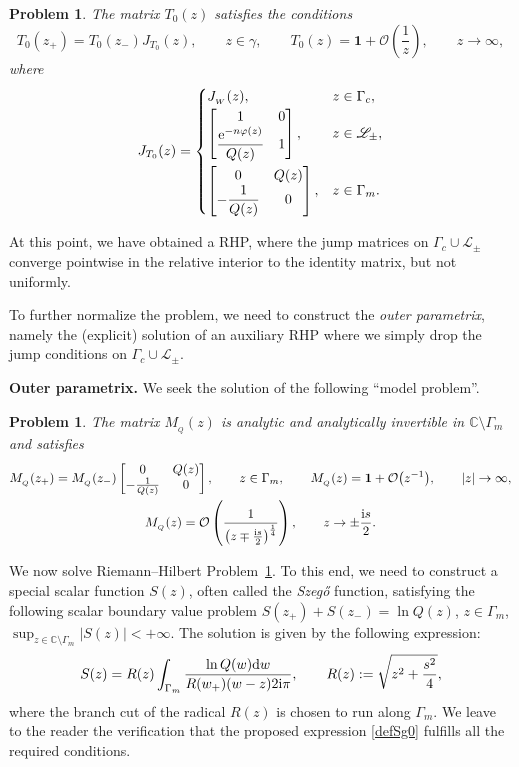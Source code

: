 \documentclass[10pt,a4paper]{amsart}
\numberwithin{equation}{section}
\newtheorem{problem}[Theorem]{Problem}
\theoremstyle{definition}
\def \scr{\mathscr}
\def\le{\left}
\def\ri{\right}
\def \d{{\mathrm d}}
\def\be{\begin{equation}}
\def\ee{\end{equation}}
\def \1{\mathbf 1}
\def\C{{\mathbb C}}
\begin{document}
\begin{problem}
\label{RHPT0}
The matrix $T_0(z)$ satisfies the conditions
\[
T_0(z_+)= T_0(z_-) J_{T_0}(z), \qquad z\in \gamma,\qquad
T_0(z) = \1 + \mathcal O\le(\frac 1 z \ri), \qquad z\to \infty,
\]
where
\[
J_{T_0}(z) =
\begin{cases}
J_{_W}(z), & z\in \Gamma_c,\\
 \begin{bmatrix}
1 & 0 \\
\displaystyle\frac{ {\rm e}^{-n\varphi(z)}}{Q(z)} & 1
\end{bmatrix},
& z\in \scr L_\pm,
\vspace{1mm}\\
\begin{bmatrix}
 0 & Q(z) \\
\displaystyle -\frac 1 {Q(z)} & 0
\end{bmatrix},
 & z\in \Gamma_m.
\end{cases}
\]
\end{problem}
At this point, we have obtained a RHP, where the jump matrices on $\Gamma_{c} \cup \scr L_\pm$ converge pointwise in the relative interior to the identity matrix, but not uniformly.

To further normalize the problem, we need to construct the {\it outer parametrix}, namely the (explicit) solution of an auxiliary RHP where we simply drop the jump conditions on $\Gamma_c\cup \scr L_\pm$.

{\bf Outer parametrix.}
We seek the solution of the following ``model problem''.
\begin{problem}
\label{RHPM0}
The matrix $M_{_Q}(z)$ is analytic and analytically invertible in $\C\setminus \Gamma_m$ and satisfies
\begin{gather*}
M_{_Q}(z_+) = M_{_Q}(z_-) \begin{bmatrix}
0 & Q(z)\\ -\frac 1 {Q(z)} & 0
\end{bmatrix},\qquad z\in \Gamma_m
,\qquad
M_{_Q}(z) = \1 + \mathcal O\bigl(z^{-1}\bigr),\qquad |z|\to \infty,\\
M_{_Q}(z) = \mathcal O\le(\frac 1{ \le(z\mp \frac {{\rm i}s}2\ri)^{\frac 1 4} }\ri),\qquad z\to \pm \frac {{\rm i}s}2.
\end{gather*}
\end{problem}
We now solve Riemann--Hilbert Problem~\ref{RHPM0}.
To this end, we need to construct a special scalar function $S(z)$, often called the {\it Szeg\H{o}} function, satisfying the following scalar boundary value problem
$S(z_+) + S(z_-) = \ln Q(z)$, $ z\in \Gamma_m$, $\sup_{z\in \C\setminus \Gamma_m} | S(z)| <+\infty$.
The solution is given by the following expression:
\be
\label{defSg0}
S(z) = R(z) \int_{\Gamma_m} \frac {\ln Q(w) \d w} {R(w_+) (w-z) 2{\rm i}\pi},\qquad R(z):= \sqrt{z^2 + \frac {s^2}4},
\ee
where the branch cut of the radical $R(z)$ is chosen to run along $\Gamma_m$.
We leave to the reader the verification that the proposed expression \eqref{defSg0} fulfills all the required conditions.
\end{document}
